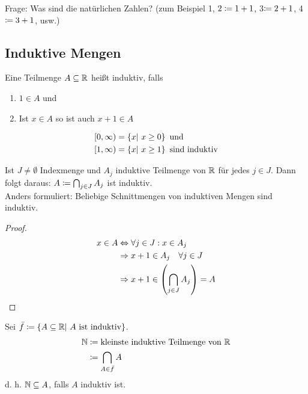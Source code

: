 \thispagestyle{pagenumberonly}
Frage: Was sind die natürlichen Zahlen? (zum Beispiel 1, $2\coloneqq 1+1$, 3$\coloneqq 2+1$, 4$\coloneqq 3+1$, usw.)

\subsection{Induktive Mengen}
\begin{definition}
    Eine Teilmenge $A\subseteq \mathbb{R}$ heißt induktiv, falls
    \begin{enumerate}
        \item $1\in A$ und
        \item Ist $x\in A$ so ist auch $x+1\in A$
    \end{enumerate}
\end{definition}

\begin{beispiel}
    \begin{align*}
        \left[0, \infty\right) &= \left\{x|~x\geq 0\right\}\text{ und}\\
        \left[1, \infty\right) &= \left\{x|~x\geq 1\right\} \text{ sind induktiv}
    \end{align*}
\end{beispiel}

\begin{beobachtung}
    Ist $J\neq\emptyset$ Indexmenge und $A_j$ induktive Teilmenge von $\mathbb{R}$ für jedes $j\in J$.
    Dann folgt daraus: $A\coloneqq \bigcap_{j\in J}A_j$ ist induktiv.\\
    Anders formuliert: Beliebige Schnittmengen von induktiven Mengen sind induktiv.
    \begin{proof}
        \begin{align*}
            x\in A &\Leftrightarrow{} \forall j\in J: x \in A_j\\
            &\Rightarrow{} x+1 \in A_j \quad \forall j\in J\\
            &\Rightarrow{} x+1 \in \left(\bigcap_{j\in J}A_j\right)=A\qedhere
        \end{align*}
    \end{proof}
\end{beobachtung}

\begin{definition}
    Sei $\bar{f}\coloneqq\left\{A\subseteq \mathbb{R}|~A\text{ ist induktiv}\right\}$.
    \begin{align*}
        \mathbb{N} &\coloneqq \text{kleinste induktive Teilmenge von }\mathbb{R}\\
        &\coloneqq \bigcap_{A\in \bar{f}}A
    \end{align*}
    d. h. $\mathbb{N}\subseteq A$, falls $A$ induktiv ist.
\end{definition}

